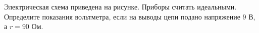 
Электрическая схема приведена на рисунке. Приборы считать идеальными. Определите показания вольтметра, 
если на выводы цепи подано напряжение $ 9 $ В, \linebreak а $ r=90 $ Ом.




